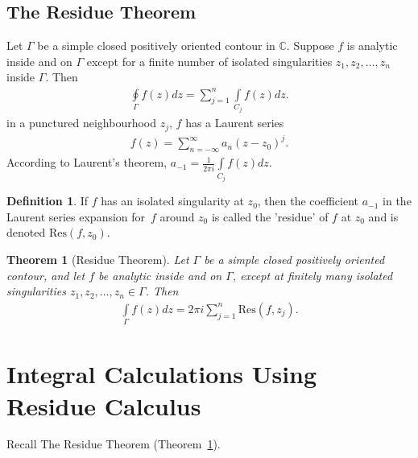 \documentclass[12pt, a4paper]{article}
\theoremstyle{plain}
\newtheorem{thm}{Theorem} %
\theoremstyle{definition}
\newtheorem{definition}{Definition} %
\begin{document}
		\subsection{The Residue Theorem} %
		\label{sub:the_residue_theorem}
			Let $\Gamma$ be a simple closed positively oriented contour in $\mathbb{C}$. Suppose $f$ is analytic inside and on $\Gamma$ except for a finite number of isolated singularities $z_1,z_2,\ldots,z_n$ inside $\Gamma$. Then
			\begin{align*}
				\oint\limits_{\Gamma} f(z)dz = \sum\limits_{j=1}^{n}\int\limits_{C_j}f(z)dz.
			\end{align*}
			in a punctured neighbourhood $z_j$, $f$ has a Laurent series 
			\begin{align*}
				f(z)=\sum\limits_{n=-\infty}^{\infty}a_n(z-z_0)^j.
			\end{align*}
			According to Laurent's theorem, $\displaystyle a_{-1} = \frac{1}{2\pi i}\int\limits_{C_j}f(z)dz$.\\

			\begin{definition}
				If $f$ has an isolated singularity at $z_0$, then the coefficient $a_{-1}$ in the Laurent series expansion for $f$ around $z_0$ is called the 'residue' of $f$ at $z_0$ and is denoted $\mathrm{Res}(f,z_0)$.\\
			\end{definition}

			\begin{thm}[Residue Theorem]
			\label{thm:residue_thm}
				Let $\Gamma$ be a simple closed positively oriented contour, and let $f$ be analytic inside and on $\Gamma$, except at finitely many isolated singularities $z_1,z_2,\ldots,z_n\in \Gamma$. Then
				\begin{align*}
					\int\limits_{\Gamma}f(z)dz = 2\pi i\sum\limits_{j=1}^{n}\mathrm{Res}(f,z_j).
				\end{align*}
			\end{thm}
	\section{Integral Calculations Using Residue Calculus} %
	\label{sec:integral_calculations_using_residue_calculus}
		Recall The Residue Theorem (Theorem~\ref{thm:residue_thm}).\\
\end{document}
